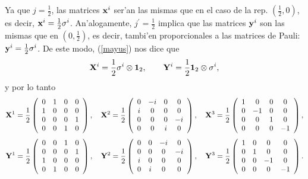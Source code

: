 Ya que $j=\frac{1}{2}$, las matrices ${\bf x}^{i}$ ser'an las mismas que
en el caso de la rep. $(\frac{1}{2},0)$, es decir, ${\bf x}^{i}=\frac{1}{2}{\bf %
\sigma }^{i}$. An'alogamente, $j^{\prime }=\frac{1}{2}$ implica que las
matrices ${\bf y}^{i}$ son las mismas que en $(0,\frac{1}{2})$, es decir,
tambi'en proporcionales a las matrices de Pauli: ${\bf y}^{i}=\frac{1}{2}%
{\bf \sigma }^{i}$. De este modo, (\ref{mayus}) nos dice que 
\begin{equation}
{\bf X}^{i}=\frac{1}{2}{\bf \sigma }^{i}\otimes {\bf 1}_{2},\qquad {\bf Y}%
^{i}=\frac{1}{2}{\bf 1}_{2}\otimes {\bf \sigma }^{i}, 
\end{equation}
y por lo tanto 
\begin{equation}
{\bf X}^1=\frac{1}{2}\left( 
\begin{array}{cccc}
0 & 1 & 0 & 0 \\ 
1 & 0 & 0 & 0 \\ 
0 & 0 & 0 & 1 \\ 
0 & 0 & 1 & 0
\end{array}
\right) ,\quad {\bf X}^2=\frac{1}{2}\left( 
\begin{array}{cccc}
0 & -i & 0 & 0 \\ 
i & 0 & 0 & 0 \\ 
0 & 0 & 0 & -i \\ 
0 & 0 & i & 0
\end{array}
\right) ,\quad {\bf X}^3=\frac{1}{2}\left( 
\begin{array}{cccc}
1 & 0 & 0 & 0 \\ 
0 & -1 & 0 & 0 \\ 
0 & 0 & 1 & 0 \\ 
0 & 0 & 0 & -1
\end{array}
\right) , 
\end{equation}
\begin{equation}
{\bf Y}^1=\frac{1}{2}\left( 
\begin{array}{cccc}
0 & 0 & 1 & 0 \\ 
0 & 0 & 0 & 1 \\ 
1 & 0 & 0 & 0 \\ 
0 & 1 & 0 & 0
\end{array}
\right) ,\quad {\bf Y}^2=\frac{1}{2}\left( 
\begin{array}{cccc}
0 & 0 & -i & 0 \\ 
0 & 0 & 0 & -i \\ 
i & 0 & 0 & 0 \\ 
0 & i & 0 & 0
\end{array}
\right) ,\quad {\bf Y}^3=\frac{1}{2}\left( 
\begin{array}{cccc}
1 & 0 & 0 & 0 \\ 
0 & 1 & 0 & 0 \\ 
0 & 0 & -1 & 0 \\ 
0 & 0 & 0 & -1
\end{array}
\right) . 
\end{equation}

